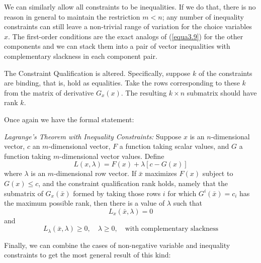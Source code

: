 We can similarly allow all constraints to be inequalities. If we do that, there is no reason in general to maintain the restriction $m<n$; any number of inequality constraints can still leave a non-trivial range of variation for the choice variables $x$. The first-order conditions are the exact analogs of (\ref{equa3.9}) for the other components and we can stack them into a pair of vector inequalities with complementary slackness in each component pair.

The Constraint Qualification is altered. Specifically, suppose $k$ of the constraints are binding, that is, hold as equalities. Take the rows corresponding to these $k$ from the matrix of derivative $G_x(x)$. The resulting $k \times n$ submatrix should have rank $k$.

Once again we have the formal statement:

\textit{Lagrange's Theorem with Inequality Constraints:} Suppose $x$ is an $n$-dimensional vector, $c$ an $m$-dimensional vector, $F$ a function taking scalar values, and $G$ a function taking $m$-dimensional vector values. Define
\begin{equation*} \tag{3.4}
L(x, \lambda) = F(x) + \lambda[c-G(x)]
\end{equation*}
where $\lambda$ is an $m$-dimensional row vector. If $\bar{x}$ maximizes $F(x)$ subject to $G(x) \leq c$, and the constraint qualification rank holds, namely that the submatrix of $G_x(\bar{x})$ formed by taking those rows $i$ for which $G^i(\bar{x})=c_i$ has the maximum possible rank, then there is a value of $\lambda$ such that
\begin{equation*} \tag{3.5}
L_x(\bar{x}, \lambda) = 0
\end{equation*}
and
\begin{equation} \label{equa3.10}
L_\lambda(\bar{x}, \lambda) \geq 0, \quad \lambda \geq0, \quad \mbox{with complementary slackness}
\end{equation}

Finally, we can combine the cases of non-negative variable and inequality constraints to get the most general result of this kind:

